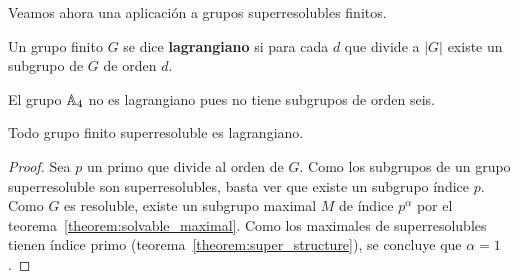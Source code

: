 Veamos ahora una aplicación a grupos superresolubles finitos.

\begin{definition}
	Un grupo finito $G$ se dice \textbf{lagrangiano} si para cada $d$ que
	divide a $|G|$ existe un subgrupo de $G$ de orden $d$.
\end{definition}

\begin{example}
	El grupo $\mathbb{A}_4$ no es lagrangiano pues no tiene subgrupos de orden seis.
\end{example}

\begin{theorem}
	Todo grupo finito superresoluble es lagrangiano. 
\end{theorem}

\begin{proof}
	Sea $p$ un primo que divide al orden de $G$.  Como los subgrupos de un
	grupo superresoluble son superresolubles, basta ver que existe un subgrupo
	índice $p$. Como $G$ es resoluble, existe un subgrupo maximal $M$ de índice
	$p^{\alpha}$ por el teorema~\ref{theorem:solvable_maximal}. Como los
	maximales de superresolubles tienen índice primo
	(teorema~\ref{theorem:super_structure}), se concluye que $\alpha=1$.
\end{proof}
